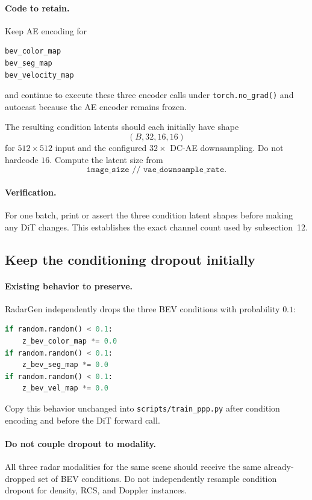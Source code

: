 \documentclass[11pt,a4paper]{article}
\begin{document}
\paragraph{Code to retain.}
Keep AE encoding for
\begin{lstlisting}
bev_color_map
bev_seg_map
bev_velocity_map
\end{lstlisting}
and continue to execute these three encoder calls under \texttt{torch.no\_grad()} and autocast because the AE encoder remains frozen.

The resulting condition latents should each initially have shape
\[
    (B,32,16,16)
\]
for \(512\times512\) input and the configured \(32\times\) DC-AE downsampling. Do not hardcode \(16\). Compute the latent size from
\[
    \texttt{image\_size // vae\_downsample\_rate}.
\]

\paragraph{Verification.}
For one batch, print or assert the three condition latent shapes before making any DiT changes. This establishes the exact channel count used by subsection~12.

\subsection{Keep the conditioning dropout initially}

\paragraph{Existing behavior to preserve.}
RadarGen independently drops the three BEV conditions with probability \(0.1\):
\begin{lstlisting}[language=Python]
if random.random() < 0.1:
    z_bev_color_map *= 0.0
if random.random() < 0.1:
    z_bev_seg_map *= 0.0
if random.random() < 0.1:
    z_bev_vel_map *= 0.0
\end{lstlisting}

Copy this behavior unchanged into \texttt{scripts/train\_ppp.py} after condition encoding and before the DiT forward call.

\paragraph{Do not couple dropout to modality.}
All three radar modalities for the same scene should receive the same already-dropped set of BEV conditions. Do not independently resample condition dropout for density, RCS, and Doppler instances.
\end{document}
